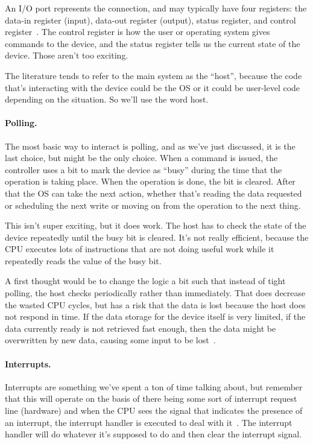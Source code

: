 An I/O port represents the connection, and may typically have four registers: the data-in register (input), data-out register (output), status register, and control register~\cite{osc}. The control register is how the user or operating system gives commands to the device, and the status register tells us the current state of the device. Those aren't too exciting. 

The literature tends to refer to the main system as the ``host'', because the code that's interacting with the device could be the OS or it could be user-level code depending on the situation. So we'll use the word host.

\paragraph{Polling.} 
The most basic way to interact is polling, and as we've just discussed, it is the last choice, but might be the only choice. When a command is issued, the controller uses a bit to mark the device as ``busy'' during the time that the operation is taking place. When the operation is done, the bit is cleared. After that the OS can take the next action, whether that's reading the data requested or scheduling the next write or moving on from the operation to the next thing. 

This isn't super exciting, but it does work. The host has to check the state of the device repeatedly until the busy bit is cleared. It's not really efficient, because the CPU executes lots of instructions that are not doing useful work while it repeatedly reads the value of the busy bit. 

A first thought would be to change the logic a bit such that instead of tight polling, the host checks periodically rather than immediately. That does decrease the wasted CPU cycles, but has a risk that the data is lost because the host does not respond in time. If the data storage for the device itself is very limited, if the data currently ready is not retrieved fast enough, then the data might be overwritten by new data, causing some input to be lost~\cite{osc}.

\paragraph{Interrupts.}
Interrupts are something we've spent a ton of time talking about, but remember that this will operate on the basis of there being some sort of interrupt request line (hardware) and when the CPU sees the signal that indicates the presence of an interrupt, the interrupt handler is executed to deal with it~\cite{osc}. The interrupt handler will do whatever it's supposed to do and then clear the interrupt signal.

